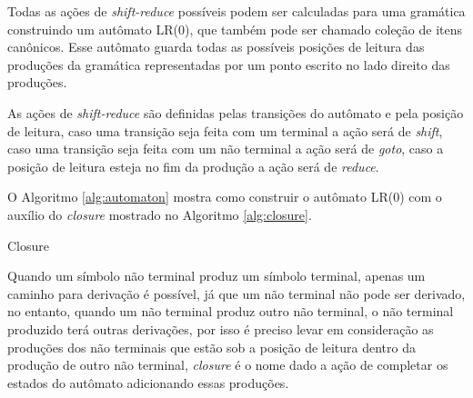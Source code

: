 Todas as ações de \textit{shift-reduce} possíveis podem ser calculadas para uma gramática construindo um autômato LR(0), que também pode ser chamado coleção de itens canônicos. Esse autômato guarda todas as possíveis posições de leitura das produções da gramática representadas por um ponto escrito no lado direito das produções.

As ações de \textit{shift-reduce} são definidas pelas transições do autômato e pela posição de leitura, caso uma transição seja feita com um terminal a ação será de \textit{shift}, caso uma transição seja feita com um não terminal a ação será de \textit{goto}, caso a posição de leitura esteja no fim da produção a ação será de \textit{reduce}. 

O Algoritmo \ref{alg:automaton} mostra como construir o autômato LR(0) com o auxílio do \textit{closure} mostrado no Algoritmo \ref{alg:closure}.

\begin{algorithm}[ht]
    \caption{Closure}\label{alg:closure}
\end{algorithm}
{}

Quando um símbolo não terminal produz um símbolo terminal, apenas um caminho para derivação é possível, já que um não terminal não pode ser derivado, no entanto, quando um não terminal produz outro não terminal, o não terminal produzido terá outras derivações, por isso é preciso levar em consideração as produções dos não terminais que estão sob a posição de leitura dentro da produção de outro não terminal, \textit{closure} é o nome dado a ação de completar os estados do autômato adicionando essas produções. 


